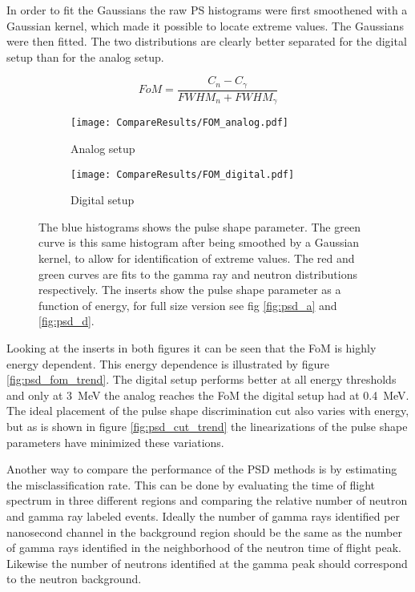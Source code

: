 \documentclass[main.tex]{subfiles}
\begin{document}
In order to fit the Gaussians the raw PS histograms were first smoothened with a Gaussian kernel, which made it possible to locate extreme values. The Gaussians were then fitted. The two distributions are clearly better separated for the digital setup than for the analog setup. 

\begin{equation}
FoM = \frac{C_n - C_\gamma}{FWHM_n + FWHM_\gamma}
\end{equation}

\begin{figure}[ht]
	\begin{subfigure}[b]{\textwidth}
	    \centering
    	    \texttt{[image: CompareResults/FOM\_analog.pdf]}
        	\caption{Analog setup}
	    \label{fig:fom_analog} 
	\end{subfigure}
	\begin{subfigure}[b]{\textwidth}
    	\centering
        	\texttt{[image: CompareResults/FOM\_digital.pdf]}
        	\caption{Digital setup}
    	\label{fig:fom_digital} 
    \end{subfigure}
    \caption{The blue histograms shows the pulse shape parameter. The green curve is this same histogram after being smoothed by a Gaussian kernel, to allow for identification of extreme values. The red and green curves are fits to the gamma ray and neutron distributions respectively. The inserts show the pulse shape parameter as a function of energy, for full size version see fig \ref{fig:psd_a} and \ref{fig:psd_d}. }
\end{figure}

Looking at the inserts in both figures it can be seen that the FoM is highly energy dependent. This energy dependence is illustrated by figure \ref{fig:psd_fom_trend}. The digital setup performs better at all energy thresholds and only at \SI{3}{MeV} the analog reaches the FoM the digital setup had at \SI{0.4}{\MeV}. The ideal placement of the pulse shape discrimination cut also varies with energy, but as is shown in figure \ref{fig:psd_cut_trend} the linearizations of the pulse shape parameters have minimized these variations.


Another way to compare the performance of the PSD methods is by estimating the misclassification rate. This can be done by evaluating the time of flight spectrum in three different regions and comparing the relative number of neutron and gamma ray labeled events. Ideally the number of gamma rays identified per nanosecond channel in the background region should be the same as the number of gamma rays identified in the neighborhood of the neutron time of flight peak. Likewise the number of neutrons identified at the gamma peak should correspond to the neutron background.
\end{document}
